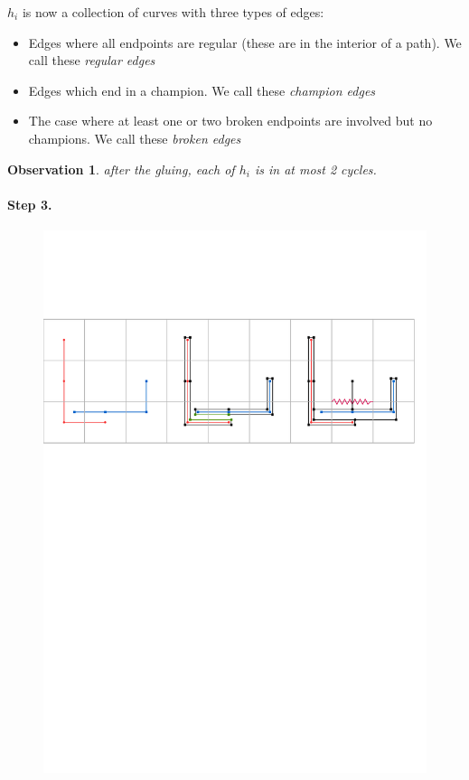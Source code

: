 \documentclass[a4paper, UKenglish]{lipics-v2018}
\newtheorem{observation}{Observation}
\begin{document}
$h_i$ is now a collection of curves with three types of edges:

\begin{itemize}
\item Edges where all endpoints are regular (these are in the interior of a path). We call these \emph{regular edges}
\item Edges which end in a champion. We call these \emph{champion edges}
\item The case where at least one or two broken endpoints are involved but no champions. We call these \emph{broken edges}
\end{itemize}


\begin{observation}
after the gluing, each of $h_i$ is in at most 2 cycles.
\end{observation}
\paragraph*{Step 3.}

\begin{figure}[H]
\centering
\includegraphics[page = 2]{Figures/cycle.pdf}
\caption{ }
\label{fig:cycle2}
\end{figure}
\end{document}
